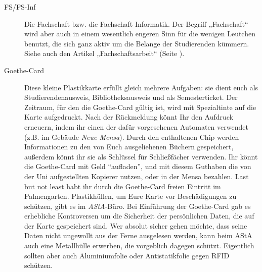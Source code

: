\begin{description}
\item[FS/FS-Inf] Die Fachschaft bzw. die Fachschaft Informatik. Der
Begriff „Fachschaft“ wird aber auch in einem wesentlich engeren Sinn
für die wenigen Leutchen benutzt, die sich ganz aktiv um die Belange
der Studierenden kümmern. Siehe auch den Artikel
„Fachschaftsarbeit“ (Seite \pageref{fachschaftsarbeit}).

\item[Goethe-Card] Diese kleine Plastikkarte erfüllt gleich mehrere
Aufgaben: sie dient euch als Studierendenausweis, Bibliotheksausweis
und als Semesterticket. Der Zeitraum, für den die Goethe-Card gültig
ist, wird mit Spezialtinte auf die Karte aufgedruckt. Nach der
Rückmeldung könnt Ihr den Aufdruck erneuern, indem ihr einen der dafür
vorgesehenen Automaten verwendet (z.B. im Gebäude \textit{Neue
Mensa}). Durch den enthaltenen Chip werden Informationen zu den von
Euch ausgeliehenen Büchern gespeichert, außerdem könnt ihr sie als
Schlüssel für Schließfächer verwenden. Ihr könnt die Goethe-Card mit
Geld ``aufladen'', und mit diesem Guthaben die von der Uni
aufgestellten Kopierer nutzen, oder in der Mensa bezahlen.
Last but not least habt ihr durch die Goethe-Card freien Eintritt im Palmengarten.
Plastikhüllen, um Eure
Karte vor Beschädigungen zu schützen, gibt es im \textit{AStA}-Büro.
Bei Einführung der Goethe-Card gab es erhebliche Kontroversen um die
Sicherheit der persönlichen Daten, die auf der Karte gespeichert sind.
Wer absolut sicher gehen möchte, dass seine Daten nicht ungewollt aus
der Ferne ausgelesen werden, kann beim AStA auch eine Metallhülle
erwerben, die vorgeblich dagegen schützt. Eigentlich sollten aber auch
Aluminiumfolie oder Antistatikfolie gegen RFID schützen.





\end{description}

